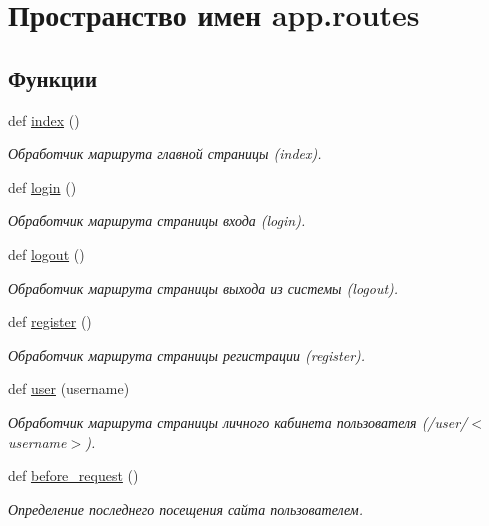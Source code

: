 \hypertarget{namespaceapp_1_1routes}{}\section{Пространство имен app.\+routes}
\label{namespaceapp_1_1routes}
\subsection*{Функции}
\begin{DoxyCompactItemize}
\item 
def \mbox{\hyperlink{namespaceapp_1_1routes_a724739005fa07eb8591ce53b0daf3dc1}{index}} ()
\begin{DoxyCompactList}\small\item\em Обработчик маршрута главной страницы (index). \end{DoxyCompactList}\item 
def \mbox{\hyperlink{namespaceapp_1_1routes_a55242b1fcb58ff44c5b793cbb5335272}{login}} ()
\begin{DoxyCompactList}\small\item\em Обработчик маршрута страницы входа (login). \end{DoxyCompactList}\item 
def \mbox{\hyperlink{namespaceapp_1_1routes_a3031cfc20f4e9f9624a1a7351483fcb3}{logout}} ()
\begin{DoxyCompactList}\small\item\em Обработчик маршрута страницы выхода из системы (logout). \end{DoxyCompactList}\item 
def \mbox{\hyperlink{namespaceapp_1_1routes_a0b407a7e4cb0434704eed996b1e254dd}{register}} ()
\begin{DoxyCompactList}\small\item\em Обработчик маршрута страницы регистрации (register). \end{DoxyCompactList}\item 
def \mbox{\hyperlink{namespaceapp_1_1routes_af3a249d21729abda41005c787d883843}{user}} (username)
\begin{DoxyCompactList}\small\item\em Обработчик маршрута страницы личного кабинета пользователя (/user/$<$username$>$). \end{DoxyCompactList}\item 
def \mbox{\hyperlink{namespaceapp_1_1routes_a8ba7eb4307e6ac0abf716627873cbade}{before\+\_\+request}} ()
\begin{DoxyCompactList}\small\item\em Определение последнего посещения сайта пользователем. \end{DoxyCompactList}\item 

\end{DoxyCompactItemize}
